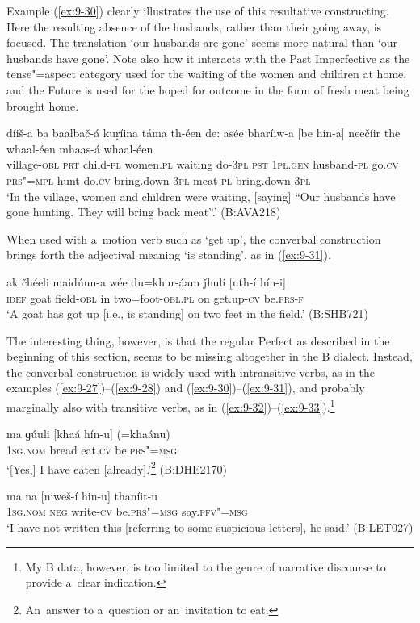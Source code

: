 Example (\ref{ex:9-30}) clearly illustrates the use of this resultative constructing. Here the resulting absence of the husbands, rather than their going away, is focused. The translation `our husbands are gone' seems more natural than `our husbands have gone'. Note also how it interacts with the Past Imperfective as the tense"=aspect category used for the waiting of the women and children at home, and the Future is used for the hoped for outcome in the form of fresh meat being brought home.

\begin{exe}
\ex
\label{ex:9-30}
\gll díiš-a ba baalbač-á kuṛíina táma th-éen de: asée bharíiw-a [be hín-a] neečíir the whaal-éen mhaas-á whaal-éen \\
village-\textsc{obl} \textsc{prt} child-\textsc{pl} women.\textsc{pl} waiting  do-\textsc{3pl} \textsc{pst } \textsc{1pl.gen} husband-\textsc{pl} go.\textsc{cv} \textsc{prs"=mpl}  hunt do.\textsc{cv} bring.down-\textsc{3pl} meat-\textsc{pl} bring.down-\textsc{3pl} \\
\glt `In the village, women and children were waiting, [saying] ``Our husbands have gone hunting. They will bring back meat''.' (B:AVA218)
\end{exe}

When used with a~motion verb such as `get up', the converbal construction brings forth the adjectival meaning `is standing', as in (\ref{ex:9-31}).

\begin{exe}
\ex
\label{ex:9-31}
\gll ak čhéeli maidúun-a wée du=khur-áam ǰhulí [uth-í hín-i] \\
\textsc{idef} goat field-\textsc{obl} in two=foot-\textsc{obl.pl} on get.up-\textsc{cv} be.\textsc{prs-f} \\
\glt `A goat has got up [i.e., is standing] on two feet in the field.' (B:SHB721)
\end{exe}

The interesting thing, however, is that the regular Perfect as described in the beginning of this section, seems to be missing altogether in the B dialect. Instead, the converbal construction is widely used with intransitive verbs, as in the examples (\ref{ex:9-27})--(\ref{ex:9-28}) and (\ref{ex:9-30})--(\ref{ex:9-31}), and probably marginally also with transitive verbs, as in (\ref{ex:9-32})--(\ref{ex:9-33}).\footnote{My B data, however, is too limited to the genre of narrative discourse to provide a~clear indication.}

\begin{exe}
\ex
\label{ex:9-32}
\gll ma ɡúuli [khaá hín-u] (=khaánu)  \\
\textsc{1sg.nom} bread eat.\textsc{cv} be.\textsc{prs"=msg} \\
\glt `[Yes,] I have eaten [already].'\footnote{An~answer to a~question or an~invitation to eat.} (B:DHE2170)

\ex
\label{ex:9-33}
\gll ma na [niweš-í hin-u] thaníit-u  \\
\textsc{1sg.nom} \textsc{neg} write-\textsc{cv} be.\textsc{prs"=msg} say.\textsc{pfv"=msg} \\
\glt `I have not written this [referring to some suspicious letters], he said.' (B:LET027)
\end{exe}


